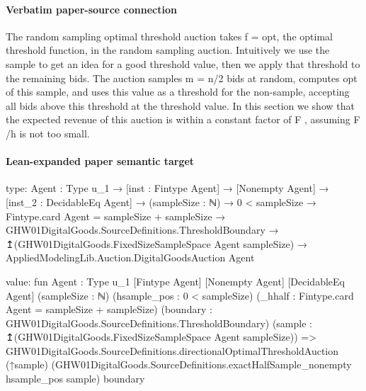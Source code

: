 \documentclass[10pt]{article}
\begin{document}
\paragraph{Verbatim paper-source connection}
\begin{ReviewVerbatim}
The random sampling optimal threshold auction
takes f = opt, the optimal threshold function, in
the random sampling auction. Intuitively we use the
sample to get an idea for a good threshold value,
then we apply that threshold to the remaining bids.
The auction samples m = n/2 bids at random, computes opt of this sample, and uses this value as a
threshold for the non-sample, accepting all bids above
this threshold at the threshold value. In this section
we show that the expected revenue of this auction is
within a constant factor of F , assuming F /h is not
too small.
\end{ReviewVerbatim}



\paragraph{Lean-expanded paper semantic target}
\begin{ReviewVerbatim}
type:
{Agent : Type u_1} →
  [inst : Fintype Agent] →
    [Nonempty Agent] →
      [inst_2 : DecidableEq Agent] →
        (sampleSize : ℕ) →
          0 < sampleSize →
            Fintype.card Agent = sampleSize + sampleSize →
              GHW01DigitalGoods.SourceDefinitions.ThresholdBoundary →
                ↥(GHW01DigitalGoods.FixedSizeSampleSpace Agent sampleSize) →
                  AppliedModelingLib.Auction.DigitalGoodsAuction Agent

value:
fun {Agent : Type u_1} [Fintype Agent] [Nonempty Agent] [DecidableEq Agent] (sampleSize : ℕ)
    (hsample_pos : 0 < sampleSize) (_hhalf : Fintype.card Agent = sampleSize + sampleSize)
    (boundary : GHW01DigitalGoods.SourceDefinitions.ThresholdBoundary)
    (sample : ↥(GHW01DigitalGoods.FixedSizeSampleSpace Agent sampleSize)) =>
  GHW01DigitalGoods.SourceDefinitions.directionalOptimalThresholdAuction (↑sample)
    (GHW01DigitalGoods.SourceDefinitions.exactHalfSample_nonempty hsample_pos sample) boundary
\end{ReviewVerbatim}
\end{document}
